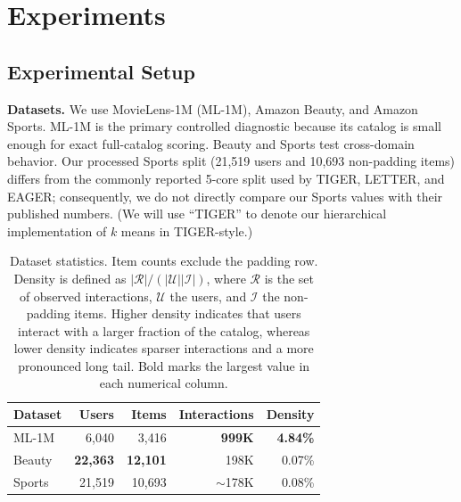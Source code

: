 \documentclass[letterpaper]{article}
\begin{document}
\section{Experiments}

\subsection{Experimental Setup}

\textbf{Datasets.}
We use MovieLens-1M (ML-1M), Amazon Beauty, and Amazon Sports. ML-1M is the primary controlled diagnostic because its catalog is small enough for exact full-catalog scoring. Beauty and Sports test cross-domain behavior. Our processed Sports split (21,519 users and 10,693 non-padding items) differs from the commonly reported 5-core split used by TIGER, LETTER, and EAGER; consequently, we do not directly compare our Sports values with their published numbers. (We will use “TIGER” to denote our hierarchical implementation of \(k\) means in TIGER-style.) 

\begin{table}[t]
\centering
\small
\begin{tabular}{lrrrr}
\toprule
Dataset & Users & Items & Interactions & Density \\
\midrule
ML-1M & 6,040 & 3,416 & \textbf{999K} & \textbf{4.84\%} \\
Beauty & \textbf{22,363} & \textbf{12,101} & 198K & 0.07\% \\
Sports & 21,519 & 10,693 & \(\sim\)178K & 0.08\% \\
\bottomrule
\end{tabular}
\caption{Dataset statistics. Item counts exclude the padding row. Density is
defined as $|\mathcal{R}|/(|\mathcal{U}||\mathcal{I}|)$, where
$\mathcal{R}$ is the set of observed interactions, $\mathcal{U}$ the users,
and $\mathcal{I}$ the non-padding items. 
Higher density indicates that users interact with a larger fraction of the
catalog, whereas lower density indicates sparser interactions and a more
pronounced long tail. Bold marks the largest value in each numerical column.}

\label{tab:data}
\end{table}
\end{document}

